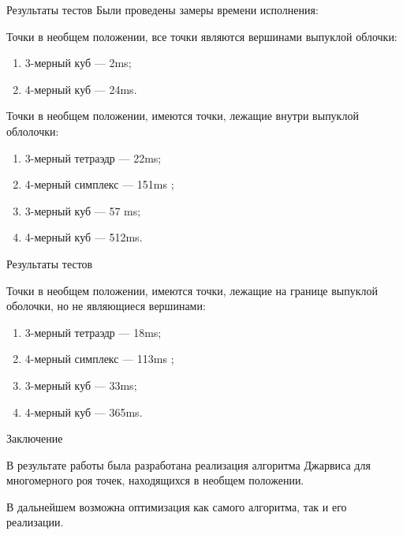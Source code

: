 \documentclass[]{beamer} %
\begin{document}
\begin{frame}{Результаты тестов}
    Были проведены замеры времени исполнения:

    Точки в необщем положении, все точки являются вершинами выпуклой облочки:
    \begin{enumerate}
        \item 3-мерный куб  --- 2ms;
        \item 4-мерный куб --- 24ms.
    \end{enumerate}
    \medskip
    Точки в необщем положении, имеются точки, лежащие внутри выпуклой облолочки:
    \begin{enumerate}
        \item 3-мерный тетраэдр --- 22ms;
        \item 4-мерный симплекс  --- 151ms ;
        \item 3-мерный куб  --- 57 ms;
        \item 4-мерный куб --- 512ms.
    \end{enumerate}
\end{frame}

\begin{frame}{Результаты тестов}


    Точки в необщем положении, имеются точки, лежащие на границе выпуклой оболочки, но не являющиеся вершинами:
    \begin{enumerate}
        \item 3-мерный тетраэдр --- 18ms;
        \item 4-мерный симплекс  --- 113ms ;
        \item 3-мерный куб  --- 33ms;
        \item 4-мерный куб --- 365ms.
    \end{enumerate}

\end{frame}

\begin{frame}{Заключение}

    В результате работы была разработана реализация алгоритма Джарвиса  для многомерного роя точек, находящихся в необщем положении.

    \smallskip

    В дальнейшем возможна оптимизация как самого алгоритма, так и его реализации.
\end{frame}

\begin{frame}
\end{frame}
\end{document}
